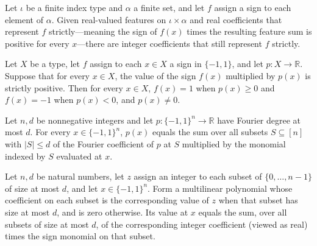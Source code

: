 \begin{theorem}
\label{FABL.exists_integer_coefficients_of_strict_representation}
\leanok
{}
Let $\iota$ be a finite index type and $\alpha$ a finite set, and let $f$ assign a sign
to each element of $\alpha$. Given real-valued features on $\iota\times\alpha$ and real
coefficients that represent $f$ strictly—meaning the sign of $f(x)$ times the resulting
feature sum is positive for every $x$—there are integer coefficients that still
represent $f$ strictly.
\end{theorem}

\begin{theorem}
\label{FABL.representation_and_ne_zero_of_strict}
\leanok
{}
Let $X$ be a type, let $f$ assign to each $x\in X$ a sign in $\{-1,1\}$, and let
$p:X\to\mathbb{R}$. Suppose that for every $x\in X$, the value of the sign $f(x)$
multiplied by $p(x)$ is strictly positive. Then for every $x\in X$, $f(x)=1$ when
$p(x)\geq 0$ and $f(x)=-1$ when $p(x)<0$, and $p(x)\neq 0$.
\end{theorem}

\begin{theorem}
\label{FABL.sum_lowDegree_fourierCoeff_eq}
\leanok
{}
Let $n,d$ be nonnegative integers and let $p:\{-1,1\}^n\to\mathbb R$ have Fourier degree
at most $d$. For every $x\in\{-1,1\}^n$, $p(x)$ equals the sum over all subsets
$S\subseteq[n]$ with $|S|\le d$ of the Fourier coefficient of $p$ at $S$ multiplied by
the monomial indexed by $S$ evaluated at $x$.
\end{theorem}

\begin{theorem}
\label{FABL.multilinearPolynomial_eq_sum_lowDegree}
\leanok
{}
Let $n,d$ be natural numbers, let $z$ assign an integer to each subset of
$\{0,\ldots,n-1\}$ of size at most $d$, and let $x\in\{-1,1\}^n$. Form a multilinear
polynomial whose coefficient on each subset is the corresponding value of $z$ when that
subset has size at most $d$, and is zero otherwise. Its value at $x$ equals the sum,
over all subsets of size at most $d$, of the corresponding integer coefficient (viewed
as real) times the sign monomial on that subset.
\end{theorem}

